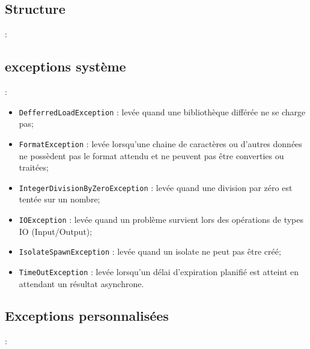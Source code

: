 \documentclass[10pt]{beamer}
\begin{document}
\subsection{Structure}
\begin{frame}[fragile,t]{\secname : \subsecname}
    
\end{frame}

\subsection{exceptions système}
\begin{frame}[fragile,t]{\secname : \subsecname}
    \begin{itemize}
        \item \lstinline[language=sql]!DefferredLoadException! : levée quand une bibliothèque différée ne se charge pas;
        \item \lstinline[language=sql]!FormatException! : levée lorsqu’une chaine de caractères ou d’autres données ne possèdent
              pas le format attendu et ne peuvent pas être converties ou traitées;
        \item \lstinline[language=sql]!IntegerDivisionByZeroException! : levée quand une division par zéro est tentée sur un nombre;
        \item \lstinline[language=sql]!IOException! : levée quand un problème survient lors des opérations de types IO (Input/Output);
        \item \lstinline[language=sql]!IsolateSpawnException! : levée quand un isolate ne peut pas être créé;
        \item \lstinline[language=sql]!TimeOutException! : levée lorsqu’un délai d’expiration planifié est atteint en attendant un résultat asynchrone.
    \end{itemize}
\end{frame}

\subsection{Exceptions personnalisées}
\begin{frame}[fragile,t]{\secname : \subsecname}
    
\end{frame}
\end{document}
